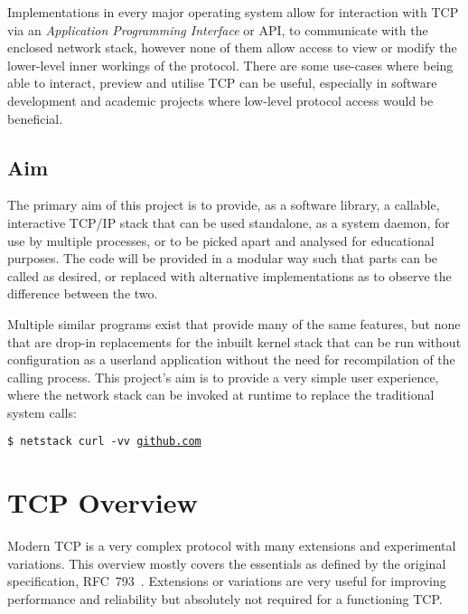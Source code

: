 \documentclass[11pt,a4paper,british]{bhamarticle}
\begin{document}
\begin{multicols}{2}
Implementations in every major operating system allow for interaction with TCP via an \textit{Application Programming Interface} or API, to communicate with the enclosed network stack, however none of them allow access to view or modify the lower-level inner workings of the protocol. There are some use-cases where being able to interact, preview and utilise TCP can be useful, especially in software development and academic projects where low-level protocol access would be beneficial.

\subsection{Aim}
The primary aim of this project is to provide, as a software library, a callable, interactive TCP/IP stack that can be used standalone, as a system daemon, for use by multiple processes, or to be picked apart and analysed for educational purposes. The code will be provided in a modular way such that parts can be called as desired, or replaced with alternative implementations as to observe the difference between the two.

Multiple similar programs exist that provide many of the same features, but none that are drop-in replacements for the inbuilt kernel stack that can be run without configuration as a userland application without the need for recompilation of the calling process. This project's aim is to provide a very simple user experience, where the network stack can be invoked at runtime to replace the traditional system calls:

\begin{center}
    \texttt{\$ netstack curl -vv \url{github.com}}
\end{center}

\section{TCP Overview}
Modern TCP is a very complex protocol with many extensions and experimental variations. This overview mostly covers the essentials as defined by the original specification, RFC~793~\cite{rfc793}. Extensions or variations are very useful for improving performance and reliability but absolutely not required for a functioning TCP. %


\end{multicols}
\end{document}
